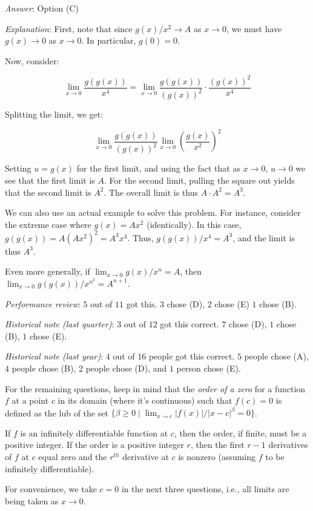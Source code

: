 \documentclass[10pt]{amsart}
\begin{document}
\begin{enumerate}
  {\em Answer}: Option (C)

  {\em Explanation}: First, note that since $g(x)/x^2 \to A$ as $x \to
  0$, we must have $g(x) \to 0$ as $x \to 0$. In particular, $g(0) =
  0$.

  Now, consider:

  $$\lim_{x \to 0} \frac{g(g(x))}{x^4} = \lim_{x \to 0} \frac{g(g(x))}{(g(x))^2} \cdot \frac{(g(x))^2}{x^4}$$

  Splitting the limit, we get:

  $$\lim_{x \to 0} \frac{g(g(x))}{(g(x))^2} \lim_{x \to 0} \left(\frac{g(x)}{x^2}\right)^2$$

  Setting $u = g(x)$ for the first limit, and using the fact that as
  $x \to 0$, $u \to 0$ we see that the first limit is $A$. For the
  second limit, pulling the square out yields that the second limit is
  $A^2$. The overall limit is thus $A \cdot A^2 = A^3$.

  We can also use an actual example to solve this problem. For
  instance, consider the extreme case where $g(x) = Ax^2$ (identically). In
  this case, $g(g(x)) = A(Ax^2)^2 = A^3x^4$. Thus, $g(g(x))/x^4 =
  A^3$, and the limit is thus $A^3$.

  Even more generally, if $\lim_{x \to 0} g(x)/x^n = A$, then $\lim_{x
  \to 0} g(g(x))/x^{n^2} = A^{n + 1}$.

  {\em Performance review}: $5$ out of $11$ got this. $3$ chose (D),
  $2$ chose (E) $1$ chose (B).

  {\em Historical note (last quarter)}: $3$ out of $12$ got this correct. $7$
  chose (D), $1$ chose (B), $1$ chose (E).

  {\em Historical note (last year)}: $4$ out of $16$ people got this
  correct. $5$ people chose (A), $4$ people chose (B), $2$ people
  chose (D), and $1$ person chose (E).

  For the remaining questions, keep in mind that the {\em order of a
  zero} for a function $f$ at a point $c$ in its domain (where it's
  continuous) such that $f(c) = 0$ is defined as the lub of the set $\{
  \beta \ge 0 \mid \lim_{x \to c} |f(x)|/|x - c|^\beta = 0 \}$.

  If $f$ is an infinitely differentiable function at $c$, then the
  order, if finite, must be a positive integer. If the order is a
  positive integer $r$, then the first $r - 1$ derivatives of $f$ at
  $c$ equal zero and the $r^{th}$ derivative at $c$ is nonzero
  (assuming $f$ to be infinitely differentiable).

  For convenience, we take $c = 0$ in the next three questions, i.e.,
  all limits are being taken as $x \to 0$.


\end{enumerate}
\end{document}
